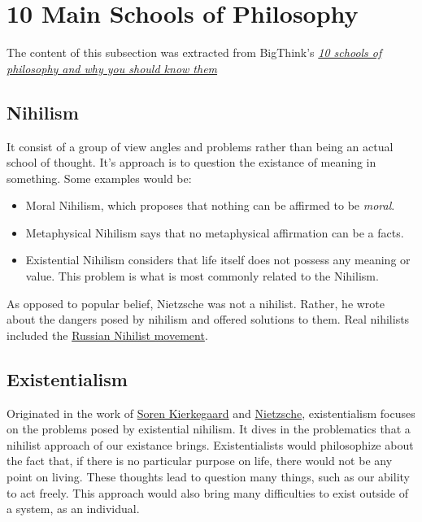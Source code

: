 \documentclass[../my_knowledge.tex]{subfiles}
\begin{document}
\section{10 Main Schools of Philosophy}
The content of this subsection was extracted from BigThink's \href{https://bigthink.com/thinking/10-schools-of-philosophy-and-why-you-should-know-them/}{\textit{10 schools of philosophy and why you should know them}} \cite{10schools}

\subsection{Nihilism}
It consist of a group of view angles and problems rather than being an actual school of thought. It's approach is to question the existance of meaning in something. Some examples would be:

\begin{itemize}
  \item Moral Nihilism, which proposes that nothing can be affirmed to be \textit{moral}.
  \item Metaphysical Nihilism says that no metaphysical affirmation can be a facts.
  \item Existential Nihilism considers that life itself does not possess any meaning or value. This problem is what is most commonly related to the Nihilism.
\end{itemize}

As opposed to popular belief, Nietzsche was not a nihilist. Rather, he wrote about the dangers posed by nihilism and offered solutions to them. Real nihilists included the
\href{https://en.wikipedia.org/wiki/Russian_nihilist_movement}{Russian Nihilist movement}.

\subsection{Existentialism}
Originated in the work of \href{https://www.youtube.com/watch?v=D9JCwkx558o}{Soren Kierkegaard} and \href{https://www.youtube.com/watch?v=wHWbZmg2hzU}{Nietzsche}, existentialism focuses on the problems posed by existential nihilism. It dives in the problematics that a nihilist approach of our existance brings. Existentialists would philosophize about the fact that, if there is no particular purpose on life, there would not be any point on living. These thoughts lead to question many things, such as our ability to act freely. This approach would also bring many difficulties to exist outside of a system, as an individual.
\end{document}
